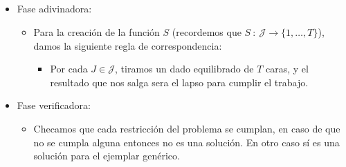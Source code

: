 \documentclass[spanish, xcolor=dvipsnames, aspectratio=169]{beamer}
\newcommand{\subsectiontitle}{}
\begin{document}
\subsection{\subsectiontitle}
\begin{frame}{\subsectiontitle}
    \begin{itemize}
        \item Fase adivinadora:
        \begin{itemize}
            \item Para la creación de la función \(S\) (recordemos que  $S \ : \ \mathcal{J} \longrightarrow \{ 1, \dotsc, T\}$), damos la siguiente regla de correspondencia:
            \begin{itemize}
                \item Por cada $J \in \mathcal{J}$, tiramos un dado equilibrado de $T$ caras, y el resultado que nos salga sera el lapso para cumplir el trabajo.
            \end{itemize}
            
        \end{itemize} 
        \item Fase verificadora:
        \begin{itemize}
            \item Checamos que cada restricción del problema se cumplan, en caso de que no se cumpla alguna entonces no es una solución. En otro caso sí es una solución para el ejemplar genérico.
        \end{itemize}
    \end{itemize}
\end{frame}
\renewcommand{\subsectiontitle}{Complejidad del algoritmo no determinista}
\end{document}
